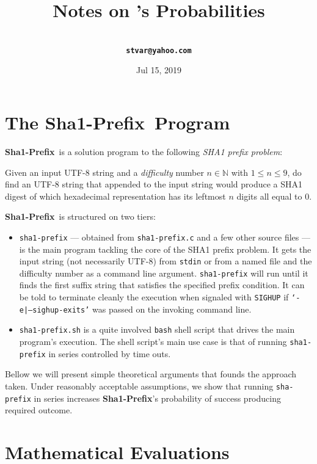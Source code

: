 \documentclass[a4paper,9pt,leqno]{article}
\title{Notes on \ShaonePrefix's Probabilities}
\author{\larger\vargyas\medskip\\ \tt\textbf{stvar@yahoo.com}}
\date{Jul 15, 2019}
\renewcommand{\=}{\protect\nobreakdash-\hspace{0pt}}
\renewcommand{\~}{\protect\nobreakdash--\hspace{0pt}}
\newcommand{\Shaoneprefix}{Sha1\=\!Prefix}
\newcommand{\ShaonePrefix}{\textbf{\Shaoneprefix}}
\newcommand{\code}[1]{{\tt{#1}}}
\theoremstyle{plain}
\theoremstyle{definition}
\theoremstyle{remark}
\newcommand\Nat{\mathbb{N}}
\newcommand\Nat*{\mathbb{N}^*}
\begin{document}
\maketitle

\section{The \ShaonePrefix\ Program}

\ShaonePrefix\ is a solution program to the following {\it SHA1 prefix problem}:

\begin{quoting}
Given an input UTF\=8 string and a {\it difficulty} number
$n \in \Nat$ with $1 \le n \le 9$, do find an UTF\=8 string that
appended to the input string would produce a SHA1 digest of
which hexadecimal representation has its leftmost $n$ digits
all equal to $0$.
\end{quoting}

\ShaonePrefix\ is structured on two tiers:

\begin{itemize}

\item \code{sha1-prefix} --- obtained from \code{sha1-prefix.c} and
a few other source files --- is the main program tackling the core of
the SHA1 prefix problem. It gets the input string (not necessarily
UTF\=8) from \code{stdin} or from a named file and the difficulty
number as a command line argument. \code{sha1-prefix} will run until it
finds the first suffix string that satisfies the specified prefix condition.
It can be told to terminate cleanly the execution when signaled with
\code{SIGHUP} if \code{`-e|--sighup-exits'} was passed on the invoking
command line.

\item \code{sha1-prefix.sh} is a quite involved \code{bash} shell
script that drives the main program's execution. The shell script's
main use case is that of running \code{sha1-prefix} in series
controlled by time outs.
\end{itemize}

Bellow we will present simple theoretical arguments that founds the
approach taken. Under reasonably acceptable assumptions, we show that
running \code{sha-prefix} in series increases \ShaonePrefix's probability
of success producing required outcome.

\section{Mathematical Evaluations}
\end{document}
